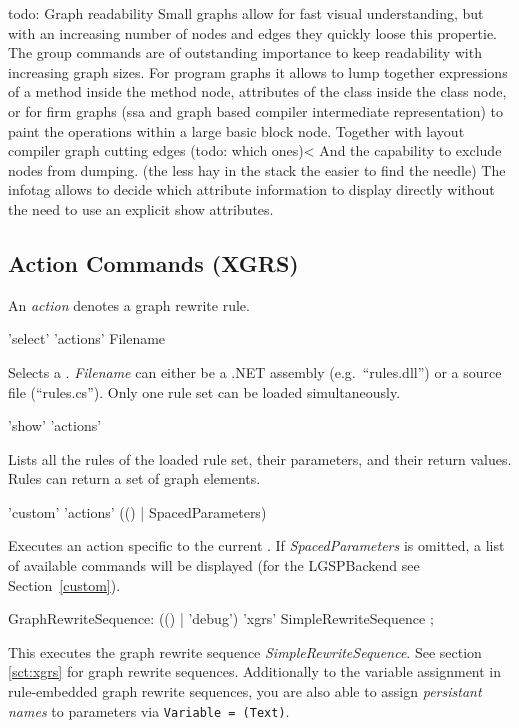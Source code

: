 \begin{note}
todo: 
Graph readability
Small graphs allow for fast visual understanding, but with an increasing number of nodes and edges they quickly loose this propertie.
The group commands are of outstanding importance to keep readability with increasing graph sizes.
For program graphs it allows to lump together expressions of a method inside the method node, attributes of the class inside the class node,
or for firm graphs (ssa and graph based compiler intermediate representation) to paint the operations within a large basic block node.
Together with layout compiler graph cutting edges (todo: which ones)<
And the capability to exclude nodes from dumping. (the less hay in the stack the easier to find the needle)
The infotag allows to decide which attribute information to display directly without the need to use an explicit show attributes. 
\end{note}


\subsection{Action Commands (XGRS)}
\label{grsthings}
An \emph{action} denotes a graph rewrite rule.

\begin{rail}
  'select' 'actions' Filename
\end{rail}
Selects a . \emph{Filename} can either be a .NET assembly (e.g.\ ``rules.dll'') or a source file (``rules.cs''). Only one rule set can be loaded simultaneously.

\begin{rail}
  'show' 'actions'
\end{rail}
Lists all the rules of the loaded rule set, their parameters, and their return values. Rules can return a set of graph elements.

\begin{rail}
  'custom' 'actions' (() | SpacedParameters)
\end{rail}
Executes an action specific to the current . If \emph{SpacedParameters} is omitted, a list of available commands will be displayed (for the LGSPBackend see Section~\ref{custom}).

\makeatletter
\begin{rail}
  GraphRewriteSequence: (() | 'debug') 'xgrs' SimpleRewriteSequence ;
\end{rail}
This executes the graph rewrite sequence \emph{SimpleRewriteSequence}.
See section \ref{sct:xgrs} for graph rewrite sequences.
Additionally to the variable assignment in rule-embedded graph rewrite sequences, you are also able to assign \emph{persistant names} to parameters via  \texttt{Variable = \@(Text)}.

